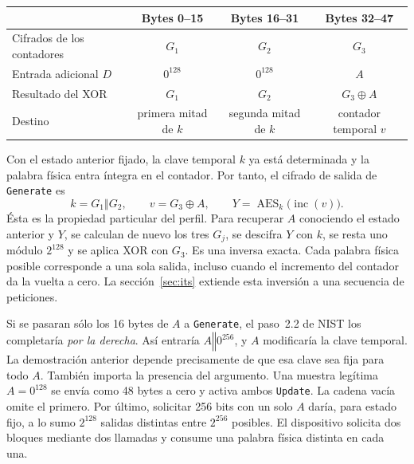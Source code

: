 \documentclass[11pt,a4paper]{article}
\newcommand{\Enc}{\operatorname{AES}}
\newcommand{\cat}{\mathbin\Vert}
\begin{document}
\begin{center}\small
\begin{tabular}{@{}lccc@{}}\toprule
 & Bytes 0--15 & Bytes 16--31 & Bytes 32--47\\\midrule
Cifrados de los contadores & \(G_1\) & \(G_2\) & \(G_3\)\\
Entrada adicional \(D\) & \(0^{128}\) & \(0^{128}\) & \(A\)\\
Resultado del XOR & \(G_1\) & \(G_2\) & \(G_3\oplus A\)\\
Destino & primera mitad de \(k\) & segunda mitad de \(k\) & contador temporal \(v\)\\\bottomrule
\end{tabular}
\end{center}
Con el estado anterior fijado, la clave temporal \(k\) ya está determinada y la palabra física entra íntegra en el contador. Por tanto, el cifrado de salida de \texttt{Generate} es
\begin{equation}
 k=G_1\cat G_2,\qquad v=G_3\oplus A,\qquad
 Y=\Enc_k\bigl(\operatorname{inc}(v)\bigr).
 \label{eq:ctr}
\end{equation}
Ésta es la propiedad particular del perfil. Para recuperar \(A\) conociendo el estado anterior y \(Y\), se calculan de nuevo los tres \(G_j\), se descifra \(Y\) con \(k\), se resta uno módulo \(2^{128}\) y se aplica XOR con \(G_3\). Es una inversa exacta. Cada palabra física posible corresponde a una sola salida, incluso cuando el incremento del contador da la vuelta a cero. La sección~\ref{sec:its} extiende esta inversión a una secuencia de peticiones.

Si se pasaran sólo los 16 bytes de \(A\) a \texttt{Generate}, el paso~2.2 de NIST los completaría \emph{por la derecha}. Así entraría \(A\cat 0^{256}\), y \(A\) modificaría la clave temporal. La demostración anterior depende precisamente de que esa clave sea fija para todo \(A\). También importa la presencia del argumento. Una muestra legítima \(A=0^{128}\) se envía como 48 bytes a cero y activa ambos \texttt{Update}. La cadena vacía omite el primero. Por último, solicitar 256 bits con un solo \(A\) daría, para estado fijo, a lo sumo \(2^{128}\) salidas distintas entre \(2^{256}\) posibles. El dispositivo solicita dos bloques mediante dos llamadas y consume una palabra física distinta en cada una.
\end{document}
